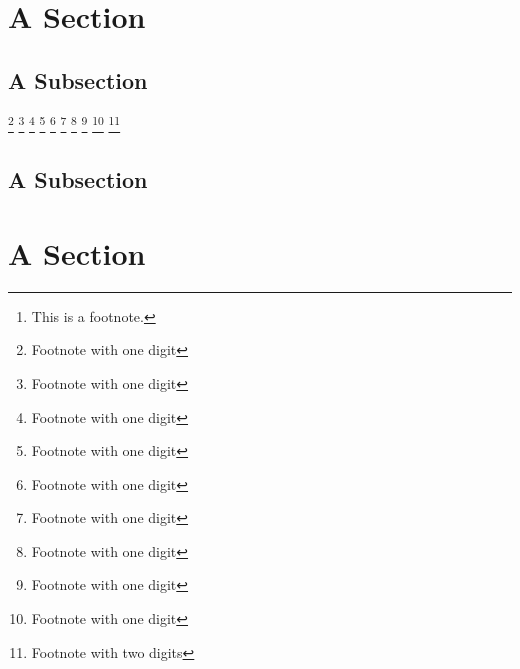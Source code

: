 \documentclass[10pt,a4paper]{article} %
\begin{document}
    \pagestyle{plain}
    \title{\rmfamily\normalfont{}}
    \author{}
    \date{} %

    \maketitle

    \begin{abstract}
        \noindent\lipsum[1] Just a test.\footnote{This is a footnote.}
    \end{abstract}

    \tableofcontents

    \section{A Section}
    \finalVersionString \lipsum[1]
    \subsection{A Subsection}
    \lipsum[1]
		\footnote{Footnote with one digit}
		\footnote{Footnote with one digit}
		\footnote{Footnote with one digit}
		\footnote{Footnote with one digit}
		\footnote{Footnote with one digit}
		\footnote{Footnote with one digit}
		\footnote{Footnote with one digit}
		\footnote{Footnote with one digit}
		\footnote{Footnote with one digit}
		\footnote{Footnote with two digits} %

    \subsection{A Subsection}

    \section{A Section}
    \lipsum[1]

    \nocite{*}
    
    
\end{document}
